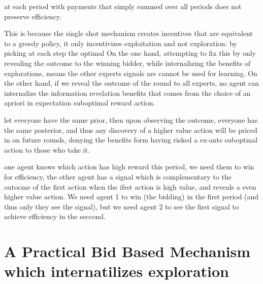  at each period with payments that simply summed over all periods does not preserve efficiency.

This is because the single shot mechanism creates incentives that are equivalent to a greedy policy, it only incentivizes exploitation and not exploration: by picking at each step the optimal 
On the one hand, attempting to fix this by only revealing the outcome to the winning bidder, while internalizing the benefits of explorations, means the other experts signals are cannot be used for learning.
On the other hand, if we reveal the outcome of the round to all experts,  no agent can internalize the information revelation benefits that comes from the choice of an apriori in expectation suboptimal reward action. 

\begin{eg}
let everyone have the same prior, then upon observing the outcome, everyone has the same posterior, and thus any discovery of a higher value action will be priced in on future rounds, denying the benefits form having risked a ex-ante suboptmal action to those who take it. 
\end{eg}

\begin{eg}
one agent knows which action has high reward this period, we need them to win for efficiency, the other agent has a signal which is complementary to the outocme of the first action when the ifrst action is high value, and reveals a even higher value action. We need agent 1 to win (the bidding) in the first period (and thus only they see the signal), but we need agent 2 to see the first signal to achieve efficiency in the seccond.
\end{eg}




\section{A Practical Bid Based Mechanism which internatilizes exploration}


